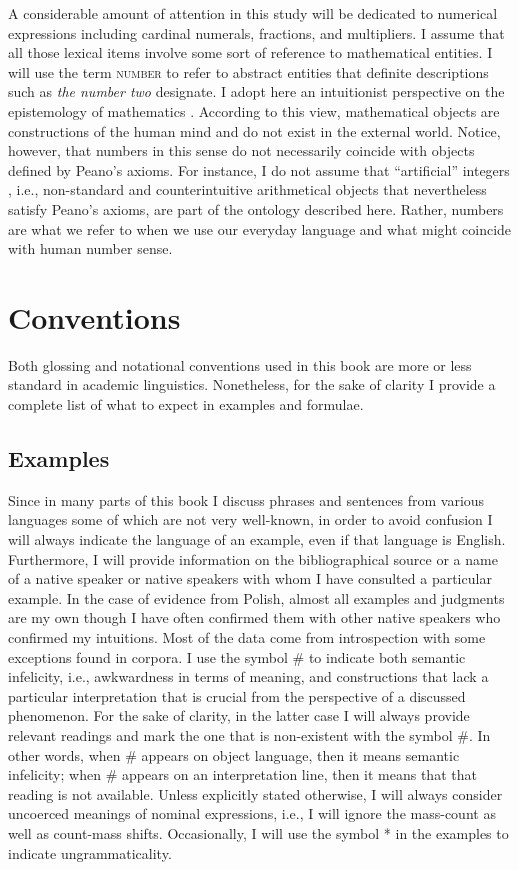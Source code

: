 A considerable amount of attention in this study will be dedicated to numerical expressions including cardinal numerals, fractions, and multipliers. I assume that all those lexical items involve some sort of reference to mathematical entities. I will use the term \textsc{number} to refer to abstract entities that definite descriptions such as \textit{the number two} designate. I adopt here an intuitionist perspective on the epistemology of mathematics \citep[see, e.g.,][]{kitcher1984nature}. According to this view, mathematical objects are constructions of the human mind and do not exist in the external world. Notice, however, that numbers in this sense do not necessarily coincide with objects defined by Peano's axioms. For instance, I do not assume that ``artificial'' integers \citep[in the sense of][pp. 238--242]{dehaene1997number}, i.e., non-standard and counterintuitive arithmetical objects that nevertheless satisfy Peano's axioms, are part of the ontology described here. Rather, numbers are what we refer to when we use our everyday language and what might coincide with human number sense.

\section{Conventions}\label{sec:conventions}

Both glossing and notational conventions used in this book are more or less standard in academic linguistics. Nonetheless, for the sake of clarity I provide a complete list of what to expect in examples and formulae.

\subsection{Examples}\label{sec:examples}

Since in many parts of this book I discuss phrases and sentences from various languages some of which are not very well-known, in order to avoid confusion I will always indicate the language of an example, even if that language is English. Furthermore, I will provide information on the bibliographical source or a name of a native speaker or native speakers with whom I have consulted a particular example. In the case of evidence from Polish, almost all examples and judgments are my own though I have often confirmed them with other native speakers who confirmed my intuitions. Most of the data come from introspection with some exceptions found in corpora. I use the symbol $\#$ to indicate both semantic infelicity, i.e., awkwardness in terms of meaning, and constructions that lack a particular interpretation that is crucial from the perspective of a discussed phenomenon. For the sake of clarity, in the latter case I will always provide relevant readings and mark the one that is non-existent with the symbol $\#$. In other words, when $\#$ appears on object language, then it means semantic infelicity; when $\#$ appears on an interpretation line, then it means that that reading is not available. Unless explicitly stated otherwise, I will always consider uncoerced meanings of nominal expressions, i.e., I will ignore the mass-count as well as count-mass shifts. Occasionally, I will use the symbol * in the examples to indicate ungrammaticality.

